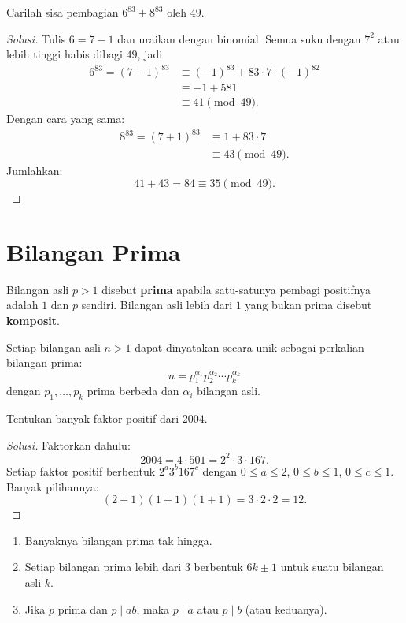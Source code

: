 \documentclass[12pt]{scrartcl}
\begin{document}
\begin{example}[AIME 1983]
Carilah sisa pembagian $6^{83} + 8^{83}$ oleh $49$.
\end{example}
\begin{proof}[Solusi]
Tulis $6 = 7 - 1$ dan uraikan dengan binomial.
Semua suku dengan $7^2$ atau lebih tinggi habis dibagi $49$, jadi
\begin{align*}
6^{83} = (7-1)^{83} &\equiv (-1)^{83} + 83 \cdot 7 \cdot (-1)^{82} \\
&\equiv -1 + 581 \\
&\equiv 41 \pmod{49}.
\end{align*}
Dengan cara yang sama:
\begin{align*}
8^{83} = (7+1)^{83} &\equiv 1 + 83 \cdot 7 \\
&\equiv 43 \pmod{49}.
\end{align*}
Jumlahkan:
\[ 41 + 43 = 84 \equiv 35 \pmod{49}. \]
\end{proof}

\section{Bilangan Prima}

\begin{definition}
Bilangan asli $p > 1$ disebut \textbf{prima} apabila satu-satunya pembagi
positifnya adalah $1$ dan $p$ sendiri. Bilangan asli lebih dari $1$ yang bukan
prima disebut \textbf{komposit}.
\end{definition}

\begin{theorem}
Setiap bilangan asli $n > 1$ dapat dinyatakan secara unik sebagai perkalian
bilangan prima:
\[ n = p_1^{\alpha_1} p_2^{\alpha_2} \cdots p_k^{\alpha_k} \]
dengan $p_1, \dots, p_k$ prima berbeda dan $\alpha_i$ bilangan asli.
\end{theorem}

\begin{example}
Tentukan banyak faktor positif dari $2004$.
\end{example}
\begin{proof}[Solusi]
Faktorkan dahulu:
\[ 2004 = 4 \cdot 501 = 2^2 \cdot 3 \cdot 167. \]
Setiap faktor positif berbentuk $2^a 3^b 167^c$ dengan
$0 \le a \le 2$, $0 \le b \le 1$, $0 \le c \le 1$.
Banyak pilihannya:
\[ (2 + 1)(1 + 1)(1 + 1) = 3 \cdot 2 \cdot 2 = 12. \]
\end{proof}

\begin{fact}
\begin{enumerate}
    \item Banyaknya bilangan prima tak hingga.
    \item Setiap bilangan prima lebih dari $3$ berbentuk $6k \pm 1$ untuk suatu bilangan asli $k$.
    \item Jika $p$ prima dan $p \mid ab$, maka $p \mid a$ atau $p \mid b$ (atau keduanya).
\end{enumerate}
\end{fact}
\end{document}

